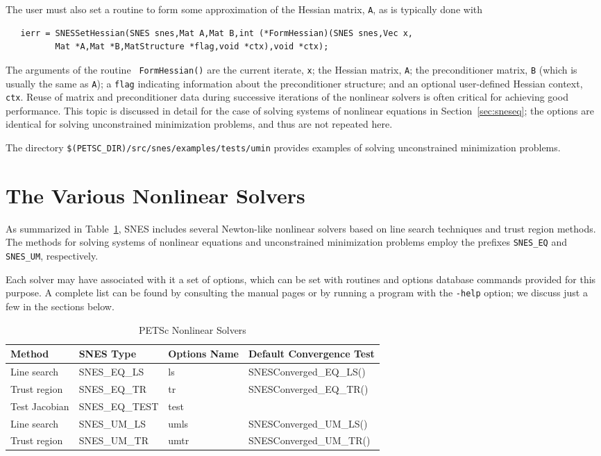 The user must also set a routine to form some approximation of the Hessian
matrix, {\tt A}, as is typically done with
\begin{verbatim}
   ierr = SNESSetHessian(SNES snes,Mat A,Mat B,int (*FormHessian)(SNES snes,Vec x,
          Mat *A,Mat *B,MatStructure *flag,void *ctx),void *ctx);
\end{verbatim}
The  arguments of the routine {\tt
FormHessian()} are the current iterate, {\tt x}; the Hessian matrix,
{\tt A}; the preconditioner matrix, {\tt B} (which is usually the same
as {\tt A}); a {\tt flag} indicating information about the
preconditioner structure; and an optional user-defined Hessian
context, {\tt ctx}.  Reuse of matrix and preconditioner data during
successive iterations of the nonlinear solvers is often critical for
achieving good performance.  This topic is discussed in detail for the
case of solving systems of nonlinear equations in
Section~\ref{sec:sneseq}; the options are identical for solving
unconstrained minimization problems, and thus are not repeated here.

The directory {\tt \$(PETSC\_DIR)/src/snes/examples/tests/umin} provides
examples of solving unconstrained minimization problems. 

\section{The Various Nonlinear Solvers}
\label{sec:nlsolvers}

As summarized in Table~\ref{tab:snesdefaults}, SNES includes several
Newton-like nonlinear solvers based on line search techniques and
trust region methods.  The methods for solving systems of nonlinear
equations and unconstrained minimization problems employ the prefixes
{\tt SNES\_EQ} and {\tt SNES\_UM}, respectively.  

Each solver may have associated with it a set of options, which can be
set with routines and options database commands provided for this
purpose.  A complete list can be found by consulting the manual pages
or by running a program with the {\tt -help} option; we discuss just a
few in the sections below.

\begin{table}
\begin{center}
\begin{tabular}{llll}
{\bf Method}    &{\bf SNES Type}& {\bf Options Name}    &{\bf Default Convergence Test}\\
\hline
Line search     & SNES\_EQ\_LS   & ls   & SNESConverged\_EQ\_LS()\\
Trust region    & SNES\_EQ\_TR   & tr   & SNESConverged\_EQ\_TR()\\
Test Jacobian   & SNES\_EQ\_TEST        & test  & \\
\hline
Line search     & SNES\_UM\_LS   & umls & SNESConverged\_UM\_LS()\\
Trust region    & SNES\_UM\_TR   & umtr & SNESConverged\_UM\_TR()\\
\hline
\end{tabular}
\end{center}
\label{tab:snesdefaults}
\caption{PETSc Nonlinear Solvers}
\end{table}

